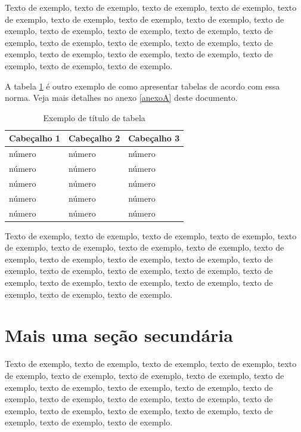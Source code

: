 \documentclass[
	12pt,				%
	oneside,			%
	a4paper,			%
	english,			%
	brazil				%
	]{abntex2ppgsi}
\begin{document}
Texto de exemplo, texto de exemplo, texto de exemplo, texto de exemplo, texto de exemplo, texto de exemplo, texto de exemplo, texto de exemplo, texto de exemplo, texto de exemplo, texto de exemplo, texto de exemplo, texto de exemplo, texto de exemplo, texto de exemplo, texto de exemplo, texto de exemplo, texto de exemplo, texto de exemplo, texto de exemplo, texto de exemplo, texto de exemplo, texto de exemplo.

A tabela \ref{tab:ExemploDeTabela5} é outro exemplo de como apresentar tabelas de acordo com essa norma. Veja mais detalhes no anexo \ref{anexoA} deste documento.

\begin{table}[htbp]
	\centering
	\caption{Exemplo de título de tabela}
		\begin{tabular}{p{1.0in} p{1.0in} p{1.0in} } \hline
		
		Cabeçalho 1	& Cabeçalho 2	& Cabeçalho 3	 \\ \hline
		número & número	& número \\ 
		número & número	& número \\ 
		número & número	& número \\ 
		número & número	& número \\ 
		número & número	& número \\ \hline
			
		\end{tabular}
	\label{tab:ExemploDeTabela5}
\end{table}


Texto de exemplo, texto de exemplo, texto de exemplo, texto de exemplo, texto de exemplo, texto de exemplo, texto de exemplo, texto de exemplo, texto de exemplo, texto de exemplo, texto de exemplo, texto de exemplo, texto de exemplo, texto de exemplo, texto de exemplo, texto de exemplo, texto de exemplo, texto de exemplo, texto de exemplo, texto de exemplo, texto de exemplo, texto de exemplo, texto de exemplo.

\section{Mais uma seção secundária}

Texto de exemplo, texto de exemplo, texto de exemplo, texto de exemplo, texto de exemplo, texto de exemplo, texto de exemplo, texto de exemplo, texto de exemplo, texto de exemplo, texto de exemplo, texto de exemplo, texto de exemplo, texto de exemplo, texto de exemplo, texto de exemplo, texto de exemplo, texto de exemplo, texto de exemplo, texto de exemplo, texto de exemplo, texto de exemplo, texto de exemplo.
\end{document}
